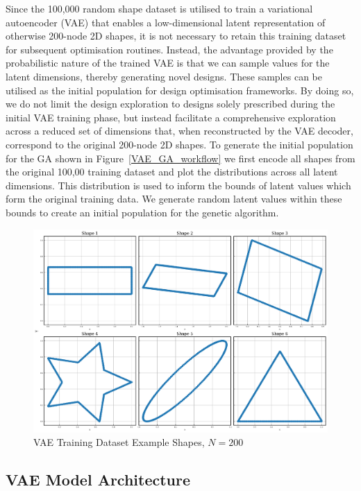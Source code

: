 \documentclass{article}
\begin{document}
Since the 100,000 random shape dataset is utilised to train a variational autoencoder (VAE) that enables a low-dimensional latent representation of otherwise 200-node 2D shapes, it is not necessary to retain this training dataset for subsequent optimisation routines. Instead, the advantage provided by the probabilistic nature of the trained VAE is that we can sample values for the latent dimensions, thereby generating novel designs. These samples can be utilised as the initial population for design optimisation frameworks. By doing so, we do not limit the design exploration to designs solely prescribed during the initial VAE training phase, but instead facilitate a comprehensive exploration across a reduced set of dimensions that, when reconstructed by the VAE decoder, correspond to the original 200-node 2D shapes. To generate the initial population for the GA shown in Figure~\ref{VAE_GA_workflow} we first encode all shapes from the original 100,00 training dataset and plot the distributions across all latent dimensions. This distribution is used to inform the bounds of latent values which form the original training data. We generate random latent values within these bounds to create an initial population for the genetic algorithm.

\begin{figure}[htp]
    \centering
    \includegraphics[width=12cm]{figures/6examples_shapes.png}
    \caption{VAE Training Dataset Example Shapes, $N=200$}
    \label{fig:vae_Shapes}
\end{figure}
\newpage{}

\subsection{VAE Model Architecture}
\end{document}
